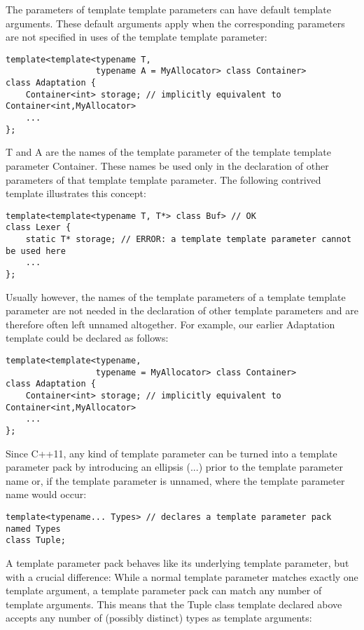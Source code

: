 The parameters of template template parameters can have default template arguments. These default arguments apply when the corresponding parameters are not specified in uses of the template template parameter:

\begin{lstlisting}[style=styleCXX]
template<template<typename T,
				  typename A = MyAllocator> class Container>
class Adaptation {
	Container<int> storage; // implicitly equivalent to Container<int,MyAllocator>
	...
};
\end{lstlisting}

T and A are the names of the template parameter of the template template parameter Container. These names be used only in the declaration of other parameters of that template template parameter. The following contrived template illustrates this concept:

\begin{lstlisting}[style=styleCXX]
template<template<typename T, T*> class Buf> // OK
class Lexer {
	static T* storage; // ERROR: a template template parameter cannot be used here
	...
};
\end{lstlisting}

Usually however, the names of the template parameters of a template template parameter are not needed in the declaration of other template parameters and are therefore often left unnamed altogether. For example, our earlier Adaptation template could be declared as follows:

\begin{lstlisting}[style=styleCXX]
template<template<typename,
				  typename = MyAllocator> class Container>
class Adaptation {
	Container<int> storage; // implicitly equivalent to Container<int,MyAllocator>
	...
};
\end{lstlisting}


Since C++11, any kind of template parameter can be turned into a template parameter pack by introducing an ellipsis (...) prior to the template parameter name or, if the template parameter is unnamed, where the template parameter name would occur:

\begin{lstlisting}[style=styleCXX]
template<typename... Types> // declares a template parameter pack named Types
class Tuple;
\end{lstlisting}

A template parameter pack behaves like its underlying template parameter, but with a crucial difference: While a normal template parameter matches exactly one template argument, a template parameter pack can match any number of template arguments. This means that the Tuple class template declared above accepts any number of (possibly distinct) types as template arguments:

